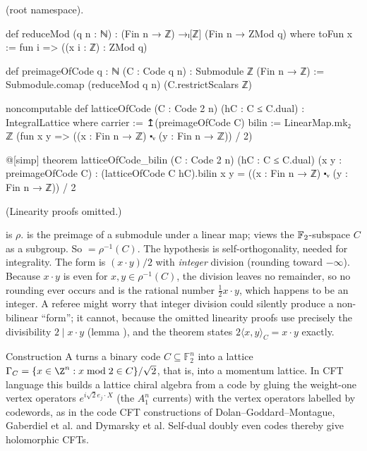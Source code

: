 \begin{definition}\label{ch02:def:latticeOfCode}
 (root namespace).
\end{definition}
\begin{leancode}
def reduceMod (q n : ℕ) : (Fin n → ℤ) →ₗ[ℤ] (Fin n → ZMod q) where
  toFun x := fun i => ((x i : ℤ) : ZMod q)

def preimageOfCode {q : ℕ} (C : Code q n) : Submodule ℤ (Fin n → ℤ) :=
  Submodule.comap (reduceMod q n) (C.restrictScalars ℤ)

noncomputable def latticeOfCode (C : Code 2 n) (hC : C ≤ C.dual) : IntegralLattice where
  carrier := ↥(preimageOfCode C)
  bilin := LinearMap.mk₂ ℤ
    (fun x y => ((x : Fin n → ℤ) ⬝ᵥ (y : Fin n → ℤ)) / 2)

@[simp] theorem latticeOfCode_bilin (C : Code 2 n) (hC : C ≤ C.dual)
    (x y : preimageOfCode C) :
    (latticeOfCode C hC).bilin x y = ((x : Fin n → ℤ) ⬝ᵥ (y : Fin n → ℤ)) / 2
\end{leancode}
(Linearity proofs omitted.)
\begin{dictionary}
 is $\rho$.   is the preimage of a submodule under a linear map;
 views the $\mathbb{F}_2$-subspace $C$ as a subgroup.  So 
$=\rho^{-1}(C)$.  The hypothesis  is self-orthogonality, needed for
integrality.  The form is $(x\cdot y)/2$ with \lean{/} \emph{integer} division (rounding toward
$-\infty$).  Because $x\cdot y$ is even for $x,y\in\rho^{-1}(C)$, the division leaves no
remainder, so no rounding ever occurs and  is the rational number
$\tfrac12x\cdot y$, which happens to be an integer.  A referee might
worry that integer division could silently produce a non-bilinear ``form''; it cannot, because
the omitted linearity proofs use precisely the divisibility $2\mid x\cdot y$ (lemma
), and the theorem  states
$2\langle x,y\rangle_C=x\cdot y$ exactly.
\end{dictionary}
\begin{physics}
Construction A turns a binary code $C\subseteq\mathbb{F}_2^n$ into a lattice $\Gamma_C=\{x\in\Z^n:x\bmod2\in C\}/\sqrt2$, that is, into a momentum lattice. In CFT language this builds a lattice chiral algebra from a code by gluing the weight-one vertex operators $e^{i\sqrt2 e_j\cdot X}$ (the $A_1^n$ currents) with the vertex operators labelled by codewords, as in the code CFT constructions of Dolan--Goddard--Montague, Gaberdiel et al. and Dymarsky et al. Self-dual doubly even codes thereby give holomorphic CFTs.
\end{physics}


